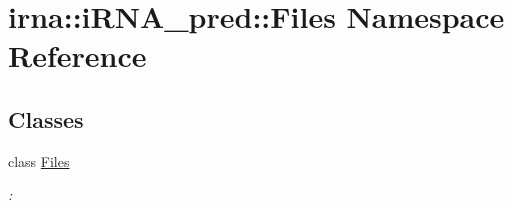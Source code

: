 \hypertarget{namespaceirna_1_1iRNA__pred_1_1Files}{
\section{irna\-:\-:i\-R\-N\-A\-\_\-pred\-:\-:\-Files \-Namespace \-Reference}
\label{namespaceirna_1_1iRNA__pred_1_1Files}
}
\subsection*{\-Classes}
\begin{DoxyCompactItemize}
\item 
class \hyperlink{classirna_1_1iRNA__pred_1_1Files_1_1Files}{\-Files}
\begin{DoxyCompactList}\small\item\em \-: \end{DoxyCompactList}\end{DoxyCompactItemize}
